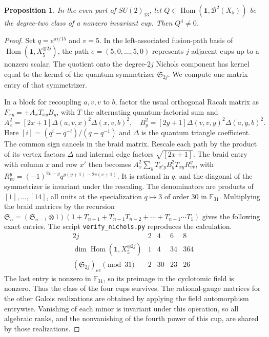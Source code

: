 \documentclass[11pt,reqno]{amsart}
\newtheorem{proposition}[theorem]{Proposition}
\theoremstyle{definition}
\newcommand{\Hom}{\operatorname{Hom}}
\newcommand{\one}{\mathbf 1}
\begin{document}
\begin{proposition}\label{prop:nichols-cup}
In the even part of $SU(2)_{13}$, let $Q\in\Hom(\one,\mathcal B^2(X_5))$ be the degree-two class of a nonzero invariant cup. Then $Q^4\ne0$.
\end{proposition}
\begin{proof}
Set $q=e^{\pi i/15}$ and $v=5$. In the left-associated fusion-path basis of $\Hom(\one,X_5^{\otimes 2j})$, the path $e=(5,0,\ldots,5,0)$ represents $j$ adjacent cups up to a nonzero scalar. The quotient onto the degree-$2j$ Nichols component has kernel equal to the kernel of the quantum symmetrizer $\mathfrak S_{2j}$. We compute one matrix entry of that symmetrizer.

In a block for recoupling $a,v,v$ to $b$, factor the usual orthogonal Racah matrix as $F_{xy}=\pm A_x T_{xy}B_y$, with $T$ the alternating quantum-factorial sum and
\[
 A_x^2=[2x+1]\Delta(a,v,x)^2\Delta(x,v,b)^2,\quad
 B_y^2=[2y+1]\Delta(v,v,y)^2\Delta(a,y,b)^2 .
\]
Here $[i]=(q^i-q^{-i})/(q-q^{-1})$ and $\Delta$ is the quantum triangle coefficient. The common sign cancels in the braid matrix. Rescale each path by the product of its vertex factors $\Delta$ and internal edge factors $\sqrt{[2x+1]}$. The braid entry with column $x$ and row $x'$ then becomes
$A_x^2\sum_y T_{x'y}B_y^2T_{xy}R_{vv}^y$, with
$R_{vv}^y=(-1)^{2v-y}q^{y(y+1)-2v(v+1)}$.
It is rational in $q$, and the diagonal of the symmetrizer is invariant under the rescaling. The denominators are products of $[1],\ldots,[14]$, all units at the specialization $q\mapsto3$ of order $30$ in $\mathbb F_{31}$. Multiplying the braid matrices by the recursion
$\mathfrak S_n=(\mathfrak S_{n-1}\otimes1)(1+T_{n-1}+T_{n-1}T_{n-2}+\cdots+T_{n-1}\cdots T_1)$
gives the following exact entries. The script \texttt{verify\_nichols.py} reproduces the calculation.
\[
\begin{array}{c|rrrr}
2j&2&4&6&8\\
\dim\Hom(\one,X_5^{\otimes 2j})&1&4&34&364\\
(\mathfrak S_{2j})_{ee}\pmod {31}&2&30&23&26
\end{array}
\]
The last entry is nonzero in $\mathbb F_{31}$, so its preimage in the cyclotomic field is nonzero. Thus the class of the four cups survives. The rational-gauge matrices for the other Galois realizations are obtained by applying the field automorphism entrywise. Vanishing of each minor is invariant under this operation, so all algebraic ranks, and the nonvanishing of the fourth power of this cup, are shared by those realizations.
\end{proof}
\end{document}
